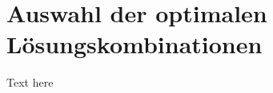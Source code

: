 \documentclass[main.tex]{subfiles} %
\begin{document}

\section{Auswahl der optimalen Lösungskombinationen}

Text here
\end{document}
